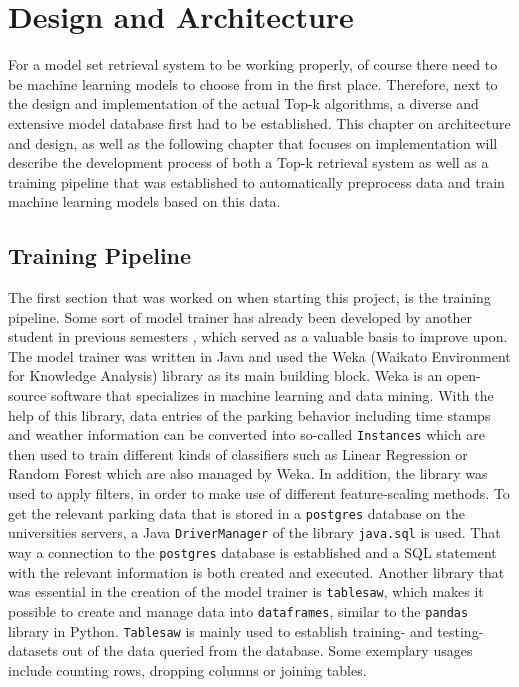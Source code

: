 \chapter{Design and Architecture} 

For a model set retrieval system to be working properly, of course there need to be machine learning models to choose from in the first place. Therefore, next to the design and implementation of the actual Top-k algorithms, a diverse and extensive model database first had to be established. This chapter on architecture and design, as well as the following chapter that focuses on implementation will describe the development process of both a Top-k retrieval system as well as a training pipeline that was established to automatically preprocess data and train machine learning models based on this data.

\section{Training Pipeline}

The first section that was worked on when starting this project, is the training pipeline. Some sort of model trainer has already been developed by another student in previous semesters %
, which served as a valuable basis to improve upon. The model trainer was written in Java and used the Weka (Waikato Environment for Knowledge Analysis) \cite{eibe2016} library as its main building block. Weka is an open-source software that specializes in machine learning and data mining. With the help of this library, data entries of the parking behavior including time stamps and weather information can be converted into so-called \texttt{Instances} which are then used to train different kinds of classifiers such as Linear Regression or Random Forest which are also managed by Weka. In addition, the library was used to apply filters, in order to make use of different feature-scaling methods. To get the relevant parking data that is stored in a \texttt{postgres} database on the universities servers, a Java \texttt{DriverManager} of the library \texttt{java.sql} is used. That way a connection to the \texttt{postgres} database is established and a SQL statement with the relevant information is both created and executed. Another library that was essential in the creation of the model trainer is \texttt{tablesaw}, which makes it possible to create and manage data into \texttt{dataframes}, similar to the \texttt{pandas} library in Python. \texttt{Tablesaw} is mainly used to establish training- and testing-datasets out of the data queried from the database. Some exemplary usages include counting rows, dropping columns or joining tables. 

